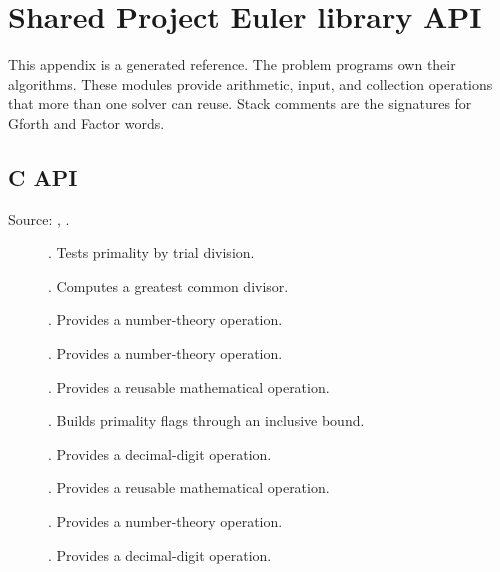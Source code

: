 \section{Shared Project Euler library API}
\label{sec:libraryapi}

This appendix is a generated reference. The problem programs own their algorithms. These modules provide arithmetic, input, and collection operations that more than one solver can reuse. Stack comments are the signatures for Gforth and Factor words.

\subsection{C API}
Source: , .
\begin{description}
\item[\texttt{}] \texttt{}. Tests primality by trial division.
\item[\texttt{}] \texttt{}. Computes a greatest common divisor.
\item[\texttt{}] \texttt{}. Provides a number-theory operation.
\item[\texttt{}] \texttt{}. Provides a number-theory operation.
\item[\texttt{}] \texttt{}. Provides a reusable mathematical operation.
\item[\texttt{}] \texttt{}. Builds primality flags through an inclusive bound.
\item[\texttt{}] \texttt{}. Provides a decimal-digit operation.
\item[\texttt{}] \texttt{}. Provides a reusable mathematical operation.
\item[\texttt{}] \texttt{}. Provides a number-theory operation.
\item[\texttt{}] \texttt{}. Provides a decimal-digit operation.

\end{description}
